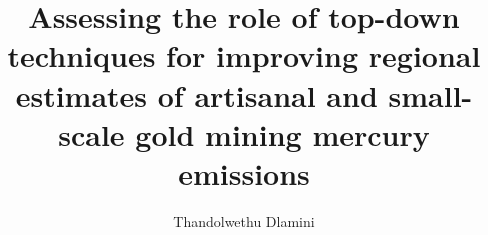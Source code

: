 % 
% 
%
%
%
%
%
%
%
%
% 
% 

\title{Assessing the role of top-down techniques for improving regional estimates of artisanal and small-scale gold mining mercury emissions}

\author{Thandolwethu Dlamini}


